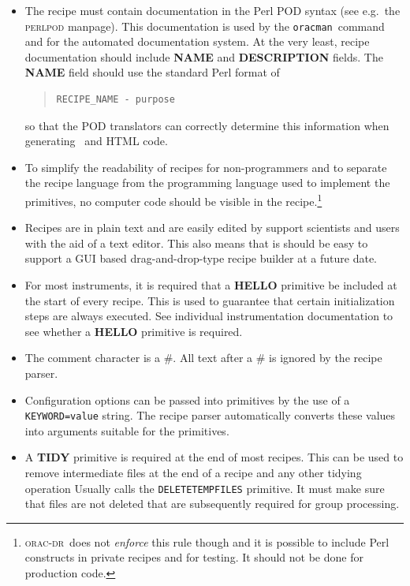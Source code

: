 \documentclass[twoside,11pt]{article}
\newcommand{\latex}[1]{#1}
\renewcommand{\_}{\texttt{\symbol{95}}}
\newcommand{\Oracdr}{\textsc{orac-dr}}
\newcommand{\oracman}{\texttt{oracman}}
\newcommand{\primitive}[1]{{\small\texttt{#1}}}
\newenvironment{myquote}{\begin{quote}\begin{small}}{\end{small}\end{quote}}
\begin{document}
\begin{itemize}
\item The recipe must contain documentation in the Perl POD syntax
(see e.g.\ the \textsc{perlpod} manpage). This documentation is used
by the \oracman\ command and for the automated documentation system.
At the very least, recipe documentation should include \textbf{NAME}
and \textbf{DESCRIPTION} fields. The \textbf{NAME} field should use
the standard Perl format of
\begin{myquote}
\begin{verbatim}
RECIPE_NAME - purpose
\end{verbatim}
\end{myquote}
so that the POD translators can correctly determine this information
when generating \latex\ and HTML code.

\item To simplify the readability of recipes for non-programmers and
to separate the recipe language from the programming language
used to implement the primitives, no computer code should be visible
in the recipe.\footnote{\Oracdr\ does not \emph{enforce} this rule
though and it is possible to include Perl constructs in private
recipes and for testing. It should not be done for production code.}

\item Recipes are in plain text and are easily edited by support
scientists and users with the aid of a text editor. This also means
that is should be easy to support a GUI based drag-and-drop-type
recipe builder at a future date.

\item For most instruments, it is required that a \textbf{HELLO}
primitive be included at the start of every recipe. This is used 
to guarantee that certain initialization steps are always
executed. See individual instrumentation documentation to see whether
a \textbf{HELLO} primitive is required.

\item The comment character is a \#. All text after a \# is ignored by 
the recipe parser.

\item Configuration options can be passed into primitives by the use
of a \texttt{KEYWORD=value} string. The recipe parser automatically
converts these values into arguments suitable for the primitives.


\item A \textbf{TIDY} primitive is required at the end of most
recipes. This can be used to remove intermediate files at the
end of a recipe and any other tidying operation Usually calls the
\primitive{\_DELETE\_TEMP\_FILES\_} primitive. It must make sure that
files are not deleted that are subsequently required for group processing.


\end{itemize}
\end{document}
